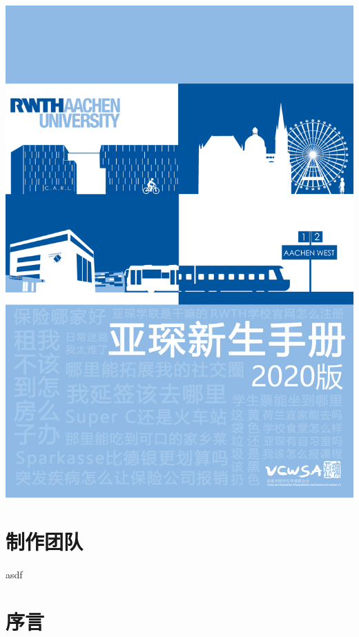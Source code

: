 \documentclass[a4paper,10pt,oneside]{scrbook}
\begin{document}
\frontmatter

\begin{titlepage}
\parindent=0pt
\includegraphics[width=\linewidth]{Bilder/Front_Cover_.png}
\end{titlepage}

\chapter*{制作团队}

asdf

\newpage

\chapter*{序言}
\end{document}
